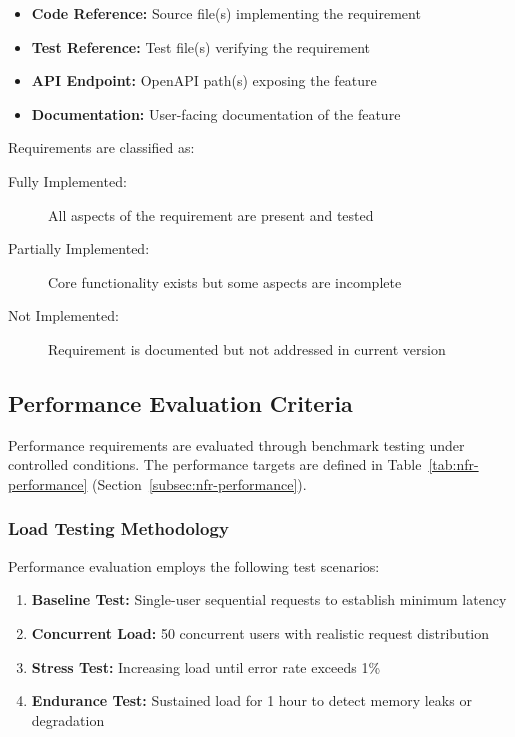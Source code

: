 \documentclass[a4paper,twoside]{sapthesis}
\begin{document}
\begin{itemize}
    \item \textbf{Code Reference:} Source file(s) implementing the requirement
    \item \textbf{Test Reference:} Test file(s) verifying the requirement
    \item \textbf{API Endpoint:} OpenAPI path(s) exposing the feature
    \item \textbf{Documentation:} User-facing documentation of the feature
\end{itemize}

Requirements are classified as:
\begin{description}
    \item[Fully Implemented:] All aspects of the requirement are present and tested
    \item[Partially Implemented:] Core functionality exists but some aspects are incomplete
    \item[Not Implemented:] Requirement is documented but not addressed in current version
\end{description}

\subsection{Performance Evaluation Criteria}
\label{subsec:performance-criteria}

Performance requirements are evaluated through benchmark testing under controlled conditions. The performance targets are defined in Table~\ref{tab:nfr-performance} (Section~\ref{subsec:nfr-performance}).

\subsubsection{Load Testing Methodology}

Performance evaluation employs the following test scenarios:

\begin{enumerate}
    \item \textbf{Baseline Test:} Single-user sequential requests to establish minimum latency
    \item \textbf{Concurrent Load:} 50 concurrent users with realistic request distribution
    \item \textbf{Stress Test:} Increasing load until error rate exceeds 1\%
    \item \textbf{Endurance Test:} Sustained load for 1 hour to detect memory leaks or degradation
\end{enumerate}
\end{document}

